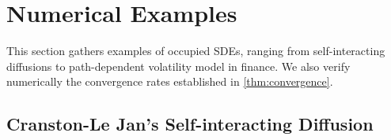\documentclass[11pt]{article}
\numberwithin{equation}{section}
\theoremstyle{plain}
\theoremstyle{definition}
\newtheorem{example}{Example}[section]
\DeclareMathOperator{\R}{\mathbb{R}}
\DeclareMathOperator{\calO}{\mathcal{O}}
\def\mo{\mathfrak{o}}
\begin{document}
\section{ Numerical Examples } %
\label{sec:numerical}

This section gathers examples of occupied SDEs, ranging from self-interacting diffusions to path-dependent volatility model in finance. We also verify numerically the  convergence rates established in \cref{thm:convergence}. 

\subsection{Cranston-Le Jan's Self-interacting  Diffusion} \label{sec:CranstonLeJan}
 
\end{document}
